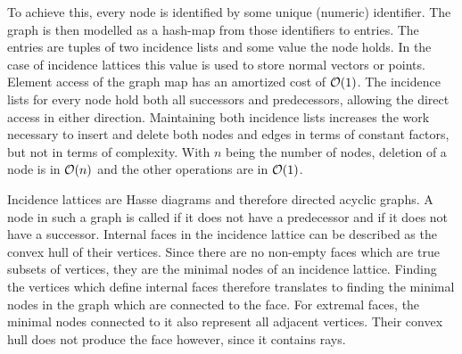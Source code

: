 To achieve this, every node is identified by some unique (numeric) identifier.
The graph is then modelled as a hash-map from those identifiers to entries.
The entries are tuples of two incidence lists and some value the node holds.
In the case of incidence lattices this value is used to store normal vectors or points.
Element access of the graph map has an amortized cost of $\mathcal{O}(1)$.
The incidence lists for every node hold both all successors and predecessors, allowing the direct access in either direction.
Maintaining both incidence lists increases the work necessary to insert and delete both nodes and edges in terms of constant factors, but not in terms of complexity.
With $n$ being the number of nodes, deletion of a node is in $\mathcal{O}(n)$ and the other operations are in $\mathcal{O}(1)$.

Incidence lattices are Hasse diagrams and therefore directed acyclic graphs.
A node in such a graph is called  if it does not have a predecessor and  if it does not have a successor.
Internal faces in the incidence lattice can be described as the convex hull of their vertices.
Since there are no non-empty faces which are true subsets of vertices, they are the minimal nodes of an incidence lattice.
Finding the vertices which define internal faces therefore translates to finding the minimal nodes in the graph which are connected to the face.
For extremal faces, the minimal nodes connected to it also represent all adjacent vertices.
Their convex hull does not produce the face however, since it contains rays.

